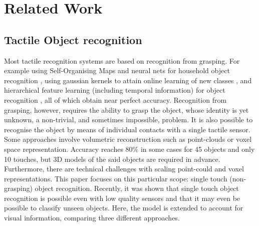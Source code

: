 \documentclass[letterpaper, 10 pt, conference]{ieeeconf}  %
\begin{document}
\section{Related Work}
\subsection{Tactile Object recognition}
Most tactile recognition systems are based on recognition from grasping. For example using Self-Organising Maps and neural nets for household object recognition \cite{Navarro2012}, using gaussian kernels to attain online learning of new classes \cite{Soh2012}, and hierarchical feature learning (including temporal information) for object recognition \cite{Madry2014}, all of which obtain near perfect accuracy.
Recognition from grasping, however, requires the ability to grasp the object, whose identity is yet unknown, a non-trivial, and sometimes impossible, problem. It is also possible to recognise the object by means of individual contacts with a single tactile sensor. Some approaches involve volumetric reconstruction \cite{Gorges2010a,Aggarwal2015} such as point-clouds or voxel space representation. Accuracy reaches 80\% in some cases for 45 objects and only 10 touches, but 3D models of the said objects are required in advance. Furthermore, there are technical challenges with scaling point-could and voxel representations. This paper focuses on this particular scope: single touch (non-grasping) object recognition. Recently, it was shown that single touch object recognition is possible even with low quality sensors \cite{Corradi2015} and that it may even be possible to classify unseen objects. Here, the model is extended to account for visual information, comparing three different approaches.
\end{document}
